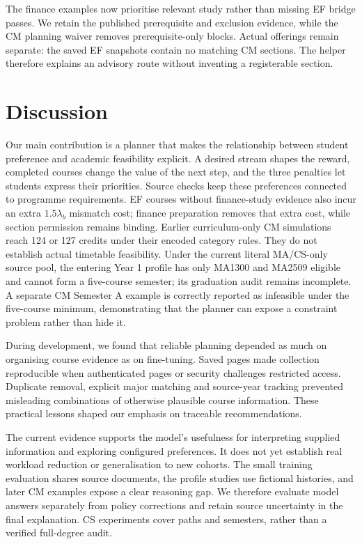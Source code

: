 \documentclass{article}
\begin{document}
The finance examples now prioritise relevant study rather than missing EF bridge passes. We retain the published prerequisite and exclusion evidence\citep{cityu-finance}, while the CM planning waiver removes prerequisite-only blocks. Actual offerings remain separate: the saved EF snapshots contain no matching CM sections. The helper therefore explains an advisory route without inventing a registerable section.

\newpage
\section{Discussion}
Our main contribution is a planner that makes the relationship between student preference and academic feasibility explicit. A desired stream shapes the reward, completed courses change the value of the next step, and the three penalties let students express their priorities. Source checks keep these preferences connected to programme requirements. EF courses without finance-study evidence also incur an extra $1.5\lambda_b$ mismatch cost; finance preparation removes that extra cost, while section permission remains binding. Earlier curriculum-only CM simulations reach 124 or 127 credits under their encoded category rules. They do not establish actual timetable feasibility. Under the current literal MA/CS-only source pool, the entering Year 1 profile has only MA1300 and MA2509 eligible and cannot form a five-course semester; its graduation audit remains incomplete. A separate CM Semester A example is correctly reported as infeasible under the five-course minimum, demonstrating that the planner can expose a constraint problem rather than hide it.

During development, we found that reliable planning depended as much on organising course evidence as on fine-tuning. Saved pages made collection reproducible when authenticated pages or security challenges restricted access. Duplicate removal, explicit major matching and source-year tracking prevented misleading combinations of otherwise plausible course information. These practical lessons shaped our emphasis on traceable recommendations.

The current evidence supports the model's usefulness for interpreting supplied information and exploring configured preferences. It does not yet establish real workload reduction or generalisation to new cohorts. The small training evaluation shares source documents, the profile studies use fictional histories, and later CM examples expose a clear reasoning gap. We therefore evaluate model answers separately from policy corrections and retain source uncertainty in the final explanation. CS experiments cover paths and semesters, rather than a verified full-degree audit.
\end{document}
